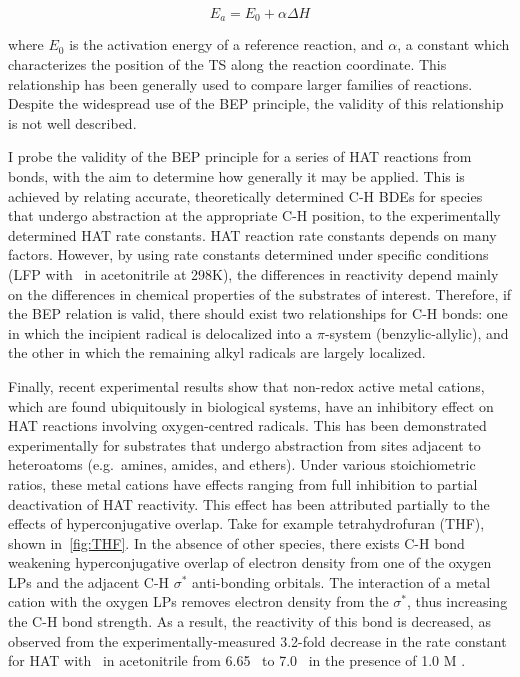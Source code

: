 \begin{equation}
  E_a = E_0 + \alpha \Delta H
  \label{eq:bep}
\end{equation}

\noindent where $E_0$ is the activation energy of a reference reaction, and
$\alpha$, a constant which characterizes the position of the TS along the
reaction coordinate. This relationship has been generally used to compare
larger families of reactions. Despite the widespread use of the BEP principle,
the validity of this relationship is not well described.

I probe the validity of the BEP principle for a series of HAT reactions from
 bonds, with the aim to determine how generally it may be applied. This
is achieved by relating accurate, theoretically determined C-H BDEs for species
that undergo abstraction at the appropriate C-H position, to the experimentally
determined HAT rate constants. HAT reaction rate constants depends on many
factors. However, by using rate constants determined under specific conditions
(LFP with \cumo\ in acetonitrile at 298K), the differences in reactivity depend
mainly on the differences in chemical properties of the substrates of interest.
Therefore, if the BEP relation is valid, there should exist two relationships
for C-H bonds: one in which the incipient radical is delocalized into a
$\pi$-system (benzylic-allylic), and the other in which the remaining alkyl
radicals are largely localized.

Finally, recent experimental results show that non-redox active metal cations,
which are found ubiquitously in biological systems, have an inhibitory effect on
HAT reactions involving oxygen-centred radicals. This has been demonstrated
experimentally for substrates that undergo abstraction from sites adjacent to
heteroatoms (e.g.\ amines, amides, and ethers). Under various stoichiometric
ratios, these metal cations have effects ranging from full inhibition to partial
deactivation of HAT reactivity.\cite{Salamone2013a, Salamone2015metals,
Salamone2016} This effect has been attributed partially to the effects of
hyperconjugative overlap. Take for example tetrahydrofuran (THF), shown
in~\ref{fig:THF}. In the absence of other species, there exists C-H bond
weakening hyperconjugative overlap of electron density from one of the oxygen
LPs and the adjacent C-H $\sigma^*$ anti-bonding orbitals. The
interaction of a metal cation with the oxygen LPs removes electron
density from the  $\sigma^*$, thus increasing the C-H bond strength. As
a result, the reactivity of this bond is decreased, as observed from the
experimentally-measured 3.2-fold decrease in the rate constant for HAT with
\cumo\ in acetonitrile from 6.65  \Ms\ to 7.0  \Ms\ in the presence of
1.0 M .\cite{Salamone2013a}

